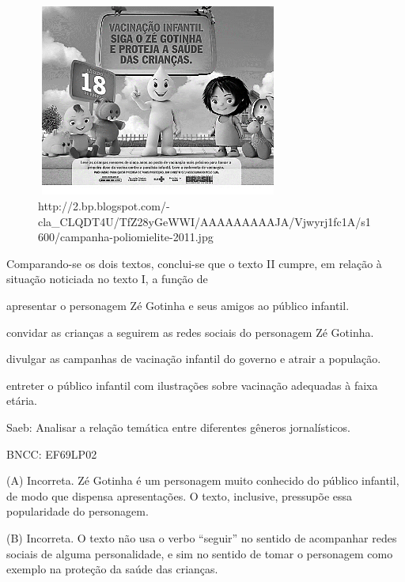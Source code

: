 \begin{figure}
\centering
\includegraphics[width=3.15625in,height=2.48418in]{./imgSAEB_8_POR/media/image32.png}
\caption{http://2.bp.blogspot.com/-cla\_CLQDT4U/TfZ28yGeWWI/AAAAAAAAAJA/Vjwyrj1fc1A/s1600/campanha-poliomielite-2011.jpg}
\end{figure}

Comparando-se os dois textos, conclui-se que o texto II cumpre, em
relação à situação noticiada no texto I, a função de

\begin{escolha}
\item apresentar o personagem Zé Gotinha e seus amigos ao público infantil.

\item convidar as crianças a seguirem as redes sociais do personagem Zé
Gotinha.

\item divulgar as campanhas de vacinação infantil do governo e atrair a
população.

\item entreter o público infantil com ilustrações sobre vacinação adequadas
à faixa etária.
\end{escolha}

Saeb: Analisar a relação temática entre diferentes gêneros
jornalísticos.

BNCC: EF69LP02

(A) Incorreta. Zé Gotinha é um personagem muito conhecido do público
infantil, de modo que dispensa apresentações. O texto, inclusive,
pressupõe essa popularidade do personagem.

(B) Incorreta. O texto não usa o verbo ``seguir'' no sentido de
acompanhar redes sociais de alguma personalidade, e sim no sentido de
tomar o personagem como exemplo na proteção da saúde das crianças.

